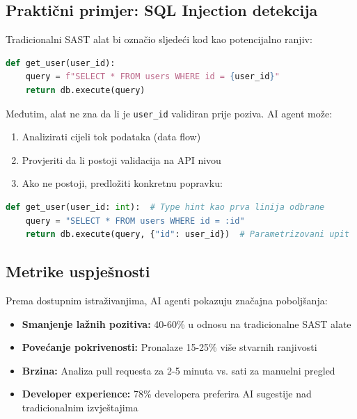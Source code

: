 \documentclass[12pt,a4paper]{article}
\begin{document}
\subsection{Praktični primjer: SQL Injection detekcija}

Tradicionalni SAST alat bi označio sljedeći kod kao potencijalno ranjiv:

\begin{lstlisting}[language=Python, caption=Potencijalno ranjiv kod]
def get_user(user_id):
    query = f"SELECT * FROM users WHERE id = {user_id}"
    return db.execute(query)
\end{lstlisting}

Međutim, alat ne zna da li je \texttt{user\_id} validiran prije poziva. AI agent može:

\begin{enumerate}
    \item Analizirati cijeli tok podataka (data flow)
    \item Provjeriti da li postoji validacija na API nivou
    \item Ako ne postoji, predložiti konkretnu popravku:
\end{enumerate}

\begin{lstlisting}[language=Python, caption=AI-predložena popravka]
def get_user(user_id: int):  # Type hint kao prva linija odbrane
    query = "SELECT * FROM users WHERE id = :id"
    return db.execute(query, {"id": user_id})  # Parametrizovani upit
\end{lstlisting}

\subsection{Metrike uspješnosti}

Prema dostupnim istraživanjima, AI agenti pokazuju značajna poboljšanja:

\begin{itemize}
    \item \textbf{Smanjenje lažnih pozitiva:} 40-60\% u odnosu na tradicionalne SAST alate
    \item \textbf{Povećanje pokrivenosti:} Pronalaze 15-25\% više stvarnih ranjivosti
    \item \textbf{Brzina:} Analiza pull requesta za 2-5 minuta vs. sati za manuelni pregled
    \item \textbf{Developer experience:} 78\% developera preferira AI sugestije nad tradicionalnim izvještajima
\end{itemize}
\end{document}

